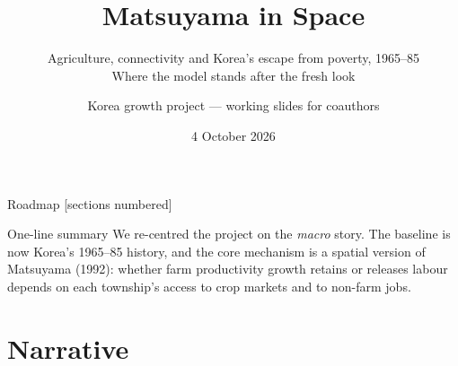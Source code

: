 \documentclass[10pt,aspectratio=169]{beamer}
\title{Matsuyama in Space}
\subtitle{Agriculture, connectivity and Korea's escape from poverty, 1965--85\\
\small Where the model stands after the fresh look}
\author{Korea growth project --- working slides for coauthors}
\date{4 October 2026}
\newcommand{\hl}[1]{\textcolor{mOrange}{#1}}
\begin{document}
\maketitle

\begin{frame}{Roadmap}
  [sections numbered]
  \tableofcontents[hideallsubsections]
  \vfill
  \begin{block}{One-line summary}
    We re-centred the project on the \emph{macro} story. The baseline is now Korea's
    1965--85 history, and the core mechanism is a spatial version of Matsuyama (1992):
    whether farm productivity growth \hl{retains} or \hl{releases} labour depends on each
    township's access to crop markets and to non-farm jobs.
  \end{block}
\end{frame}

\section{Narrative}
\end{document}
